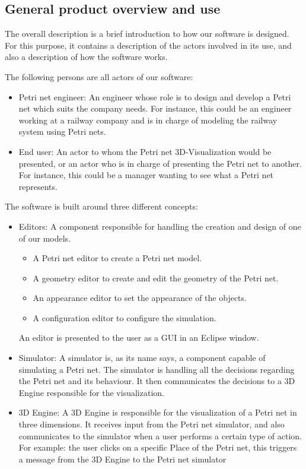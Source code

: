 \subsection{General product overview and use}
The overall description is a brief introduction to how our software is designed. For this purpose, it contains a description of the actors involved in its use, and also a description of how the software works. \newline

The following persons are all actors of our software:

\begin{itemize}
  \item Petri net engineer: An engineer whose role is to design and develop a Petri net which suits the company needs. \newline
  For instance, this could be an engineer working at a railway company and is in charge of modeling the railway system using Petri nets.
  \item End user: An actor to whom the Petri net 3D-Visualization would be presented, or an actor who is in charge of presenting the Petri net to another. \newline
	For instance, this could be a manager wanting to see what a Petri net represents. 
\end{itemize}

The software is built around three different concepts: 

\begin{itemize}
  \item Editors: A component responsible for handling the creation and design of one of our models. 
	\begin{itemize}
	 \item A Petri net editor to create a Petri net model.
	 \item A geometry editor to create and edit the geometry of the Petri net.
	 \item An appearance editor to set the appearance of the objects.
	 \item A configuration editor to configure the simulation.
	 \end{itemize}
	An editor is presented to the user as a GUI in an Eclipse window.
  \item Simulator: A simulator is, as its name says, a component capable of simulating a Petri net.
	The simulator is handling all the decisions regarding the Petri net and its behaviour. 
	It then communicates the decisions to a 3D Engine responsible for the visualization.
  \item 3D Engine: A 3D Engine is responsible for the visualization of a Petri net in three dimensions.
	It receives input from the Petri net simulator, and also communicates to the simulator when a user performs a certain type of action. \newline
	For example: the user clicks on a specific Place of the Petri net, this triggers a message from the 3D Engine to the Petri net simulator 
\end{itemize}

